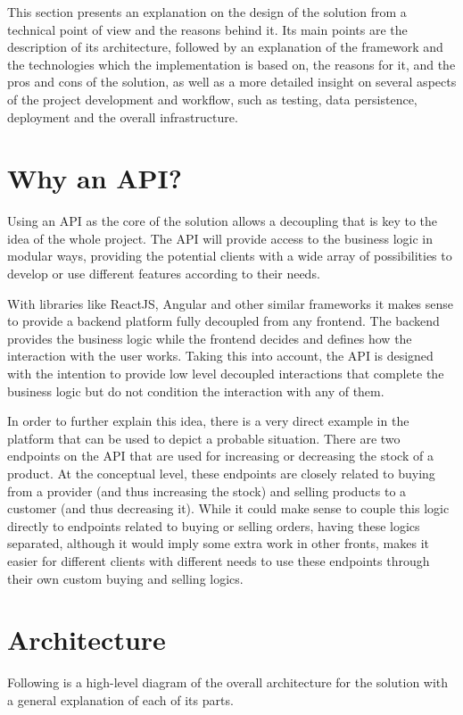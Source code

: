 This section presents an explanation on the design of the solution from a technical point of view and the reasons behind it. Its main points are the description of its architecture, followed by an explanation of the framework and the technologies which the implementation is based on, the reasons for it, and the pros and cons of the solution, as well as a more detailed insight on several aspects of the project development and workflow, such as testing, data persistence, deployment and the overall infrastructure.

\section{Why an API?}
Using an API as the core of the solution allows a decoupling that is key to the idea of the whole project. The API will provide access to the business logic in modular ways, providing the potential clients with a wide array of possibilities to develop or use different features according to their needs.

With libraries like ReactJS, Angular and other similar frameworks it makes sense to provide a backend platform fully decoupled from any frontend. The backend provides the business logic while the frontend decides and defines how the interaction with the user works. Taking this into account, the API is designed with the intention to provide low level decoupled interactions that complete the business logic but do not condition the interaction with any of them.

In order to further explain this idea, there is a very direct example in the platform that can be used to depict a probable situation. There are two endpoints on the API that are used for increasing or decreasing the stock of a product. At the conceptual level, these endpoints are closely related to buying from a provider (and thus increasing the stock) and selling products to a customer (and thus decreasing it). While it could make sense to couple this logic directly to endpoints related to buying or selling orders, having these logics separated, although it would imply some extra work in other fronts, makes it easier for different clients with different needs to use these endpoints through their own custom buying and selling logics.

\section{Architecture}
Following is a high-level diagram of the overall architecture for the solution with a general explanation of each of its parts.

